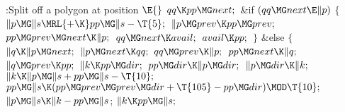 \B{}:Split off a polygon at position \X${}\E{}$\6
$\\{qq}\K\\{pp}\MG\\{next};{}$\6
\&{if} ${}(\\{qq}\MG\\{next}\E\|p){}$\5
${}\{{}$\1\6
${}\|p\MG\|s\MRL{+{\K}}\\{pp}\MG\|s-\T{5};{}$\6
${}\|p\MG\\{prev}\K\\{pp}\MG\\{prev};{}$\6
${}\\{pp}\MG\\{prev}\MG\\{next}\K\|p;{}$\6
${}\\{qq}\MG\\{next}\K\\{avail};{}$\6
${}\\{avail}\K\\{pp};{}$\6
\4${}\}{}$\2\6
\&{else}\5
${}\{{}$\1\6
${}\|q\K\|p\MG\\{next};{}$\6
${}\|p\MG\\{next}\K\\{qq};{}$\6
${}\\{qq}\MG\\{prev}\K\|p;{}$\6
${}\\{pp}\MG\\{next}\K\|q;{}$\6
${}\|q\MG\\{prev}\K\\{pp};{}$\6
${}\|k\K\\{pp}\MG\\{dir};{}$\6
${}\\{pp}\MG\\{dir}\K\|p\MG\\{dir};{}$\6
${}\|p\MG\\{dir}\K\|k;{}$\6
${}\|k\K\|p\MG\|s+\\{pp}\MG\|s-\T{10};{}$\6
${}\\{pp}\MG\|s\K(\\{pp}\MG\\{prev}\MG\\{prev}\MG\\{dir}+\T{105}-\\{pp}\MG%
\\{dir})\MOD\T{10};{}$\6
${}\|p\MG\|s\K\|k-\\{pp}\MG\|s{}$;\6
${}\|k\K\\{pp}\MG\|s;{}$\6
